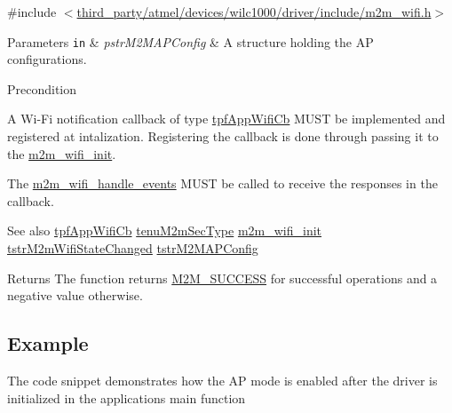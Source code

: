 {\ttfamily \#include $<$\hyperlink{m2m__wifi_8h}{third\+\_\+party/atmel/devices/wilc1000/driver/include/m2m\+\_\+wifi.\+h}$>$}


\begin{DoxyParams}[1]{Parameters}
\mbox{\tt in}  & {\em pstr\+M2\+M\+A\+P\+Config} & A structure holding the AP configurations.\\
\hline
\end{DoxyParams}
\begin{DoxyPrecond}{Precondition}

\begin{DoxyItemize}
\item A Wi-\/\+Fi notification callback of type \hyperlink{group__WlanEnums_gac5302f32839285fe8375c159087aa8a1}{tpf\+App\+Wifi\+Cb} M\+U\+ST be implemented and registered at intalization. Registering the callback is done through passing it to the \hyperlink{group__WifiInitFn_ga73c734812e844d96d860c4e93e9daf35}{m2m\+\_\+wifi\+\_\+init}.
\item The \hyperlink{group__WifiHandleEventsFn_ga461a4edc057cec8c00cf124a07aa3b02}{m2m\+\_\+wifi\+\_\+handle\+\_\+events} M\+U\+ST be called to receive the responses in the callback.
\end{DoxyItemize}
\end{DoxyPrecond}
\begin{DoxySeeAlso}{See also}
\hyperlink{group__WlanEnums_gac5302f32839285fe8375c159087aa8a1}{tpf\+App\+Wifi\+Cb} \hyperlink{group__WlanEnums_gaa232a09c953ec8200c13774f94107b05}{tenu\+M2m\+Sec\+Type} \hyperlink{group__WifiInitFn_ga73c734812e844d96d860c4e93e9daf35}{m2m\+\_\+wifi\+\_\+init} \hyperlink{structtstrM2mWifiStateChanged}{tstr\+M2m\+Wifi\+State\+Changed} \hyperlink{structtstrM2MAPConfig}{tstr\+M2\+M\+A\+P\+Config}
\end{DoxySeeAlso}
\begin{DoxyReturn}{Returns}
The function returns \hyperlink{nm__common_8h_a9ef27ba27aafdd1aa3a79d3ba2c36b8f}{M2\+M\+\_\+\+S\+U\+C\+C\+E\+SS} for successful operations and a negative value otherwise. 
\end{DoxyReturn}
\hypertarget{group__WifiEnableMonitorModeFn_Example}{}\subsection{Example}\label{group__WifiEnableMonitorModeFn_Example}
The code snippet demonstrates how the AP mode is enabled after the driver is initialized in the application\textquotesingle{}s main function 
